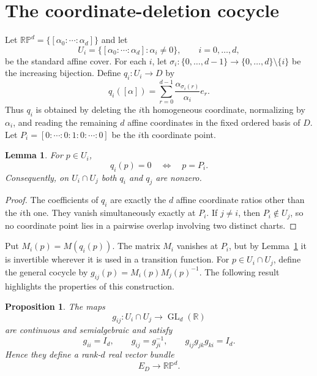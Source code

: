 \documentclass[12pt]{article}
\theoremstyle{plain}
\newtheorem{proposition}[theorem]{Proposition}
\newtheorem{lemma}[theorem]{Lemma}
\theoremstyle{definition}
\newcommand{\R}{\mathbb R}
\newcommand{\RP}{\mathbb{RP}}
\newcommand{\GL}{\operatorname{GL}}
\begin{document}
\section{The coordinate-deletion cocycle}
\label{sec:cocycle}

Let $\RP^d=\{[\alpha_0:\cdots:\alpha_d]\}$ and let
\[
U_i=\{[\alpha_0:\cdots:\alpha_d]:\alpha_i\ne0\},
\qquad i=0,\ldots,d,
\]
be the standard affine cover. For each $i$, let
$\sigma_i:\{0,\ldots,d-1\}
\longrightarrow\{0,\ldots,d\}\setminus\{i\}$ be the increasing bijection. Define $q_i:U_i\longrightarrow D$
by
\[
q_i([\alpha])
=\sum_{r=0}^{d-1}
\frac{\alpha_{\sigma_i(r)}}{\alpha_i}e_r.
\]
Thus $q_i$ is obtained by deleting the $i$th homogeneous coordinate,
normalizing by $\alpha_i$, and reading the remaining $d$ affine
coordinates in the fixed ordered basis of $D$. Let $P_i=[0:\cdots:0:1:0:\cdots:0]$ be the $i$th coordinate point.

\begin{lemma}
	\label{lem:q-zero-general}
	For $p\in U_i$,
	\[
	q_i(p)=0\quad\Longleftrightarrow\quad p=P_i.
	\]
	Consequently, on $U_i\cap U_j$ both $q_i$ and $q_j$ are nonzero.
\end{lemma}

\begin{proof}
	The coefficients of $q_i$ are exactly the $d$ affine coordinate ratios
	other than the $i$th one. They vanish simultaneously exactly at
	$P_i$. If $j\ne i$, then $P_i\notin U_j$, so no coordinate point lies
	in a pairwise overlap involving two distinct charts.
\end{proof}

Put $M_i(p)=M(q_i(p))$. The matrix $M_i$ vanishes at $P_i$, but by
Lemma~\ref{lem:q-zero-general} it is invertible wherever it is used in
a transition function. For $p\in U_i\cap U_j$, define the general cocycle by $	g_{ij}(p)=M_i(p)M_j(p)^{-1}$. The following result highlights the properties of this construction. 

\begin{proposition}
	\label{prop:general-cocycle}
	The maps
	\[
	g_{ij}:U_i\cap U_j\longrightarrow\GL_d(\R)
	\]
	are continuous and semialgebraic and satisfy
	\[
	g_{ii}=I_d,
	\qquad
	g_{ij}=g_{ji}^{-1},
	\qquad
	g_{ij}g_{jk}g_{ki}=I_d.
	\]
	Hence they define a rank-$d$ real vector bundle
	\[
	E_D\longrightarrow\RP^d.
	\]
\end{proposition}
\end{document}
